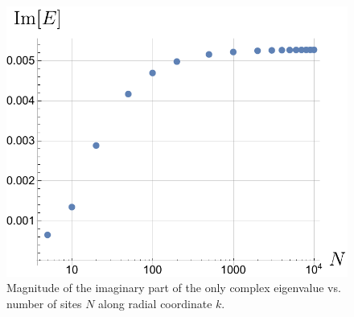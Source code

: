 \documentclass[english,aps,prd,nofootinbib,twocolumn]{revtex4-1}
\begin{document}
\begin{figure}[h]
\centering
\includegraphics[scale=0.6]{MaxImEigVal.pdf}
\caption{Magnitude of the imaginary part of the only complex eigenvalue vs. number of sites $N$ along radial coordinate $k$.}
\label{fig:MaxImEigVal}
\end{figure}
\end{document}
